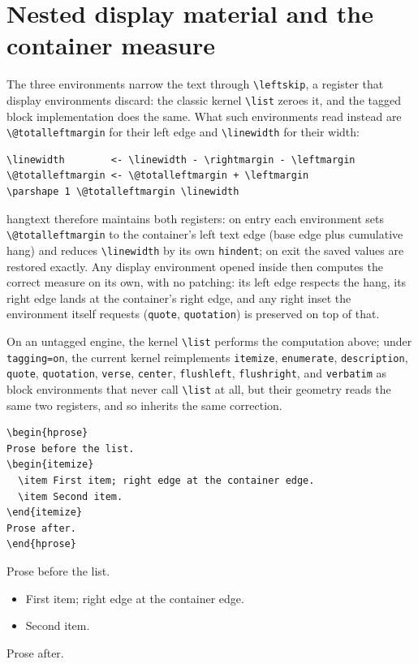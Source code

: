 \documentclass[11pt, twoside, openany]{article}
\newcommand{\pkg}[1]{\textsf{#1}}
\newcommand{\opt}[1]{\texttt{#1}}
\newcommand{\env}[1]{\texttt{#1}}
\newcommand{\cs}[1]{\texttt{\textbackslash #1}}
\begin{document}
\section{Nested display material and the container measure}\label{sec:lists}

The three environments narrow the text through \cs{leftskip}, a register that display environments discard: the classic kernel \cs{list} zeroes it, and the tagged block implementation does the same. What such environments read instead are \cs{@totalleftmargin} for their left edge and \cs{linewidth} for their width:

\begin{verbatim}
\linewidth        <- \linewidth - \rightmargin - \leftmargin
\@totalleftmargin <- \@totalleftmargin + \leftmargin
\parshape 1 \@totalleftmargin \linewidth
\end{verbatim}

\pkg{hangtext} therefore maintains both registers: on entry each environment sets \cs{@totalleftmargin} to the container's left text edge (base edge plus cumulative hang) and reduces \cs{linewidth} by its own \opt{hindent}; on exit the saved values are restored exactly. Any display environment opened inside then computes the correct measure on its own, with no patching: its left edge respects the hang, its right edge lands at the container's right edge, and any right inset the environment itself requests (\env{quote}, \env{quotation}) is preserved on top of that.

On an untagged engine, the kernel \cs{list} performs the computation above; under \opt{tagging=on}, the current kernel reimplements \env{itemize}, \env{enumerate}, \env{description}, \env{quote}, \env{quotation}, \env{verse}, \env{center}, \env{flushleft}, \env{flushright}, and \env{verbatim} as block environments that never call \cs{list} at all, but their geometry reads the same two registers, and so inherits the same correction.

\begin{verbatim}
\begin{hprose}
Prose before the list.
\begin{itemize}
  \item First item; right edge at the container edge.
  \item Second item.
\end{itemize}
Prose after.
\end{hprose}
\end{verbatim}

\begin{hprose}
Prose before the list. \lipsum[18][1-3]
\begin{itemize}
  \item First item; right edge at the container edge.
  \item Second item.
\end{itemize}
Prose after. \lipsum[19][1-3]
\end{hprose}
\end{document}
